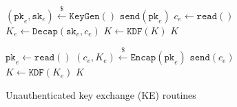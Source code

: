 \documentclass[journal=tches,submission]{iacrtrans}
\newcommand{\keygen}{\texttt{KeyGen}}
\newcommand{\encap}{\texttt{Encap}}
\newcommand{\decap}{\texttt{Decap}}
\newcommand{\pk}{\texttt{pk}}
\newcommand{\sk}{\texttt{sk}}
\newcommand{\leftsample}{\stackrel{\$}{\leftarrow}}
\begin{document}
\begin{figure}[h]
    \centering
    \begin{minipage}[b]{0.49\textwidth}
        \begin{algorithm}[H]
            \caption*{$\texttt{KE}_\texttt{C}()$}\label{alg:ke-client}
            \begin{algorithmic}[1]
                \State $(\pk_e, \sk_e) \leftsample \keygen()$
                \State $\texttt{send}(\pk_e)$
                \State $c_e \leftarrow \texttt{read}()$
                \State $K_e \leftarrow \decap(\sk_e, c_e)$
                \State $K \leftarrow \texttt{KDF}(K)$
                \State \Return $K$
            \end{algorithmic}
        \end{algorithm}
    \end{minipage}\hfill
    \begin{minipage}[b]{0.49\textwidth}
            \begin{algorithm}[H]
                \caption*{$\texttt{KE}_\texttt{S}()$}\label{alg:ke-server}
                \begin{algorithmic}[1]
                    \State $\pk_e \leftarrow \texttt{read}()$
                    \State $(c_e, K_e) \leftsample \encap(\pk_e)$
                    \State $\texttt{send}(c_e)$
                    \State $K \leftarrow \texttt{KDF}(K_e)$
                    \State \Return $K$
                \end{algorithmic}
            \end{algorithm}
    \end{minipage}

    \caption{Unauthenticated key exchange (KE) routines}\label{fig:ke-routines}
\end{figure}
\end{document}
